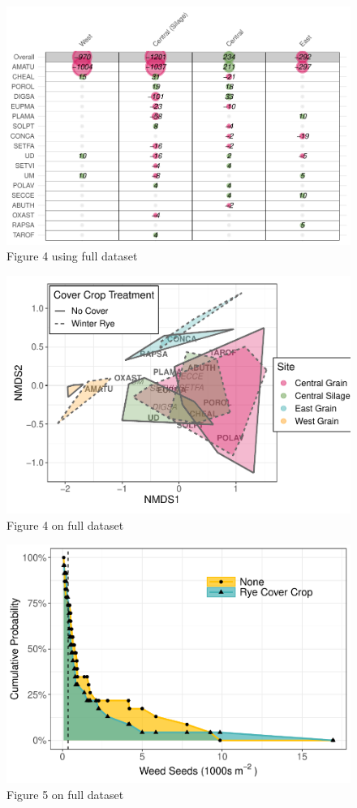 \documentclass[]{article}
\begin{document}
\begin{figure}
\centering
\includegraphics{supp-mat_files/figure-latex/unnamed-chunk-11-1.pdf}
\caption{Figure 4 using full dataset}
\end{figure}

\newpage

\begin{figure}
\centering
\includegraphics{supp-mat_files/figure-latex/unnamed-chunk-12-1.pdf}
\caption{Figure 4 on full dataset}
\end{figure}

\newpage

\begin{figure}
\centering
\includegraphics{supp-mat_files/figure-latex/unnamed-chunk-13-1.pdf}
\caption{Figure 5 on full dataset}
\end{figure}
\end{document}
